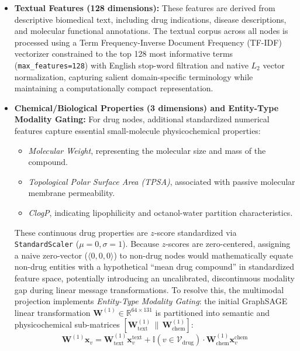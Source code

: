 \documentclass[conference,a4paper]{IEEEtran}
\begin{document}
\begin{itemize}
    \item \textbf{Textual Features (128 dimensions):} 
    These features are derived from descriptive biomedical text, including drug indications, disease descriptions, and molecular functional annotations. The textual corpus across all nodes is processed using a Term Frequency-Inverse Document Frequency (TF-IDF) vectorizer constrained to the top 128 most informative terms (\texttt{max\_features=128}) with English stop-word filtration and native $L_2$ vector normalization, capturing salient domain-specific terminology while maintaining a computationally compact representation.
    
    \item \textbf{Chemical/Biological Properties (3 dimensions) and Entity-Type Modality Gating:} 
    For drug nodes, additional standardized numerical features capture essential small-molecule physicochemical properties:
    \begin{itemize}
        \item \textit{Molecular Weight}, representing the molecular size and mass of the compound.
        \item \textit{Topological Polar Surface Area (TPSA)}, associated with passive molecular membrane permeability.
        \item \textit{ClogP}, indicating lipophilicity and octanol-water partition characteristics.
    \end{itemize}
    These continuous drug properties are $z$-score standardized via \texttt{StandardScaler} ($\mu=0, \sigma=1$). Because $z$-scores are zero-centered, assigning a naive zero-vector ($\langle 0, 0, 0 \rangle$) to non-drug nodes would mathematically equate non-drug entities with a hypothetical ``mean drug compound'' in standardized feature space, potentially introducing an uncalibrated, discontinuous modality gap during linear message transformations. To resolve this, the multimodal projection implements \textit{Entity-Type Modality Gating}: the initial GraphSAGE linear transformation $\mathbf{W}^{(1)} \in \mathbb{R}^{64 \times 131}$ is partitioned into semantic and physicochemical sub-matrices $[\mathbf{W}_{\text{text}}^{(1)} \,\|\, \mathbf{W}_{\text{chem}}^{(1)}]$:
    \begin{equation}
    \mathbf{W}^{(1)} \mathbf{x}_v = \mathbf{W}_{\text{text}}^{(1)} \mathbf{x}_v^{\text{text}} + \mathbb{I}(v \in \mathcal{V}_{\text{drug}}) \cdot \mathbf{W}_{\text{chem}}^{(1)} \mathbf{x}_v^{\text{chem}}
    \label{eq:modality_gating}

\end{equation}
\end{itemize}
\end{document}
